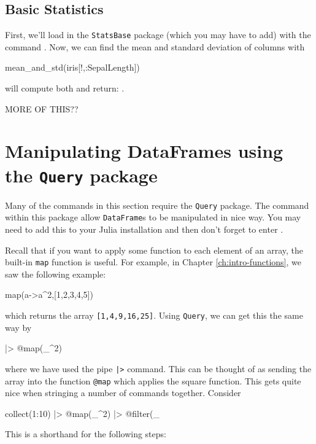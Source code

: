 \subsection{Basic Statistics} 

First, we'll load in the \texttt{StatsBase} package (which you may have
to add) with the command . Now, we can find the mean and standard deviation of columns with 
\begin{jlblock}[data]
mean_and_std(iris[!,:SepalLength])
\end{jlblock}
%
will compute both and return:  \printpythontex[verb].


{\color{red} MORE OF THIS??}

\section{Manipulating DataFrames using the \texttt{Query} package} 

Many of the commands in this section require the \texttt{Query} package. The command within this package allow \verb!DataFrame!s to be manipulated in nice way.  You may need to add this to your Julia installation and then don't forget to enter . 

Recall that if you want to apply some function to each element of an array, the built-in \texttt{map} function is useful.  For example, in Chapter \ref{ch:intro-functions}, we saw the following example:
%
\begin{jlblock}[data]
map(a->a^2,[1,2,3,4,5])
\end{jlblock}
%
which returns the array \texttt{[1,4,9,16,25]}. Using \texttt{Query}, we can get this the same way by

\begin{jlblock}[data]
[1,2,3,4,5] |> @map(_^2)
\end{jlblock}
%
where we have used the pipe \texttt{|>} command.  This can be thought of as sending the array into the function \texttt{@map} which applies the square function. This gets quite nice when stringing a number of commands together.  Consider
%
\begin{jlblock}[data]
collect(1:10) |> @map(_^2) |> @filter(_%
\end{jlblock}
This is a shorthand for the following steps: 

